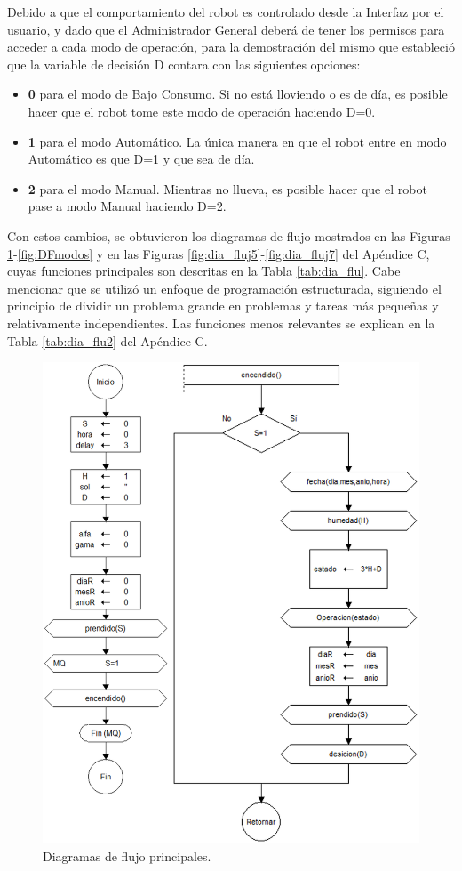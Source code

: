 Debido a que el comportamiento del robot es controlado desde la Interfaz por el usuario, y dado que el Administrador General deberá de tener los permisos para acceder a cada modo de operación, para la demostración del mismo que estableció que la variable de decisión D contara con las siguientes opciones:

\begin{itemize}
    \item \textbf{0} para el modo de Bajo Consumo. Si no está lloviendo o es de día, es posible hacer que el robot tome este modo de operación haciendo D=0.
    \item \textbf{1} para el modo Automático. La única manera en que el robot entre en modo Automático es que D=1 y que sea de día.
    \item \textbf{2} para el modo Manual. Mientras no llueva, es posible hacer que el robot pase a modo Manual haciendo D=2.
\end{itemize}

Con estos cambios, se obtuvieron los diagramas de flujo mostrados en las Figuras \ref{fig:DFmain1}-\ref{fig:DFmodos} y en las Figuras \ref{fig:dia_fluj5}-\ref{fig:dia_fluj7} del Apéndice C, cuyas funciones principales son descritas en la Tabla \ref{tab:dia_flu}. Cabe mencionar que se utilizó un enfoque de programación estructurada, siguiendo el principio de dividir un problema grande en problemas y tareas más pequeñas y relativamente independientes. Las funciones menos relevantes se explican en la Tabla \ref{tab:dia_flu2} del Apéndice C.

\begin{figure}[H]
	\centering
	\includegraphics[width=12cm]{imagenes/DFmain1}
	\caption{Diagramas de flujo principales.}
	\label{fig:DFmain1}
\end{figure}


